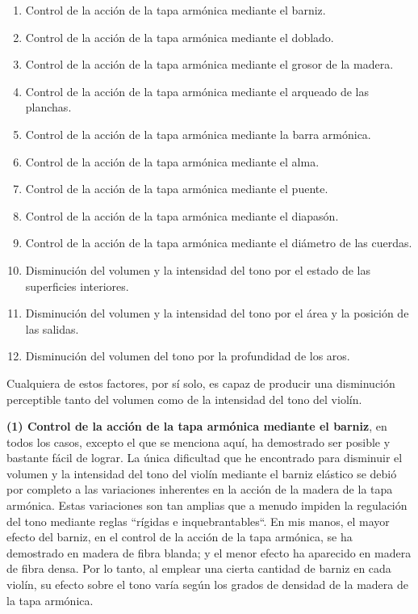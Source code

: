 \documentclass[12pt]{book}
\begin{document}
\begin{enumerate}
    \item Control de la acción de la tapa armónica mediante el barniz.
    \item Control de la acción de la tapa armónica mediante el doblado.
    \item Control de la acción de la tapa armónica mediante el grosor de la madera.
    \item Control de la acción de la tapa armónica mediante el arqueado de las planchas.
    \item Control de la acción de la tapa armónica mediante la barra armónica.
    \item Control de la acción de la tapa armónica mediante el alma.
    \item Control de la acción de la tapa armónica mediante el puente.
    \item Control de la acción de la tapa armónica mediante el diapasón.
    \item Control de la acción de la tapa armónica mediante el diámetro de las cuerdas.
    \item Disminución del volumen y la intensidad del tono por el estado de las superficies interiores.
    \item Disminución del volumen y la intensidad del tono por el área y la posición de las salidas.
    \item Disminución del volumen del tono por la profundidad de los aros.
\end{enumerate}

Cualquiera de estos factores, por sí solo, es capaz de producir una disminución perceptible tanto del volumen como de la intensidad del tono del violín.

\textbf{(1) Control de la acción de la tapa armónica mediante el barniz}, en todos los casos, excepto el que se menciona aquí, ha demostrado ser posible y bastante fácil de lograr. La única dificultad que he encontrado para disminuir el volumen y la intensidad del tono del violín mediante el barniz elástico se debió por completo a las variaciones inherentes en la acción de la madera de la tapa armónica. Estas variaciones son tan amplias que a menudo impiden la regulación del tono mediante reglas ``rígidas e inquebrantables``. En mis manos, el mayor efecto del barniz, en el control de la acción de la tapa armónica, se ha demostrado en madera de fibra blanda; y el menor efecto ha aparecido en madera de fibra densa. Por lo tanto, al emplear una cierta cantidad de barniz en cada violín, su efecto sobre el tono varía según los grados de densidad de la madera de la tapa armónica.
\end{document}
